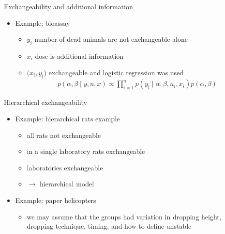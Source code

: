 \documentclass[finnish,english,t]{beamer}
\begin{document}
\begin{frame}{Exchangeability and additional information}

  \begin{itemize}
  \item Example: bioassay
    \begin{itemize}
      \item<+-> $y_i$ number of dead animals are not exchangeable alone
      \item<+-> $x_i$ dose is additional information
      \item<+-> $(x_i,y_i$) exchangeable and logistic regression was used
    \begin{align*}
      p(\alpha,\beta \mid y,n,x)\propto \prod_{i=1}^n p(y_i \mid \alpha,\beta,n_i,x_i)p(\alpha,\beta)
    \end{align*}
    \end{itemize}
  \end{itemize}
\end{frame}

\begin{frame}{Hierarchical exchangeability}

  \begin{itemize}
  \item Example: hierarchical rats example
    \begin{itemize}
    \item<+-> all rats not exchangeable
    \item<+-> in a single laboratory rats exchangeable
    \item<+-> laboratories exchangeable
    \item<+-> $\rightarrow$ hierarchical model
    \end{itemize}
  \item<+-> Example: paper helicopters
    \begin{itemize}
    \item we may assume that the groups had variation in dropping height, dropping technique, timing, and how to define unstable
    \end{itemize}
  \end{itemize}
\end{frame}
\end{document}
